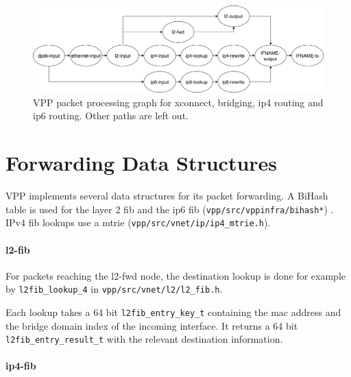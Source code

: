 \begin{figure}[!ht]
\noindent\hspace{0.5mm}\includegraphics[width=\linewidth]{pics/vpp-nodes-horizontal.png}
\caption{VPP packet processing graph for xconnect, bridging, \Ac{ip4} routing and \Ac{ip6} routing. Other paths are left out. }
\label{nodegraph}
\end{figure}

 
\section{Forwarding Data Structures}

VPP implements several data structures for its packet forwarding. A
BiHash table is used for the layer 2 \Ac{fib} and the ip6 \Ac{fib}
(\lstinline|vpp/src/vppinfra/bihash*|) \cite{vppwiki:bihash}. IPv4
\Ac{fib} lookups use a mtrie
(\lstinline|vpp/src/vnet/ip/ip4_mtrie.h|).



\paragraph{l2-fib}

For packets reaching the l2-fwd node, the destination lookup is done
for example by \lstinline|l2fib_lookup_4| in
\lstinline|vpp/src/vnet/l2/l2_fib.h|. 

Each lookup takes a 64 bit \lstinline|l2fib_entry_key_t| containing
the mac address and the bridge domain index of the incoming interface.
It returns a 64 bit \lstinline|l2fib_entry_result_t| with the relevant
destination information. 


\paragraph{\Ac{ip4}-fib}

